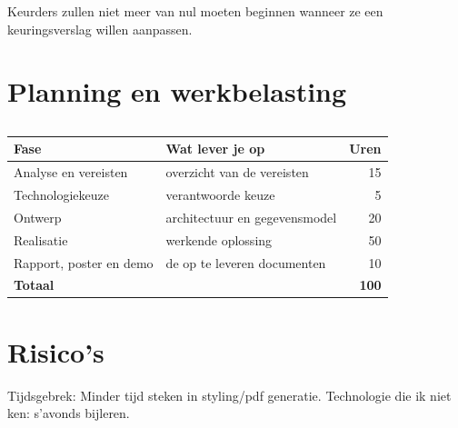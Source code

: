 Keurders zullen niet meer van nul moeten beginnen wanneer ze een keuringsverslag willen aanpassen.


\section{Planning en werkbelasting}%
\label{vst:planning}


\begin{table}[htbp]
  \centering
  \begin{tabular}{llr}
    \toprule
    \textbf{Fase} & \textbf{Wat lever je op} & \textbf{Uren} \\
    \midrule
    Analyse en vereisten      & overzicht van de vereisten   & 15  \\
    Technologiekeuze          & verantwoorde keuze           & 5  \\
    Ontwerp                   & architectuur en gegevensmodel& 20  \\
    Realisatie                & werkende oplossing           & 50  \\
    Rapport, poster en demo   & de op te leveren documenten  & 10  \\
    \midrule
    \textbf{Totaal}           &                              & \textbf{100} \\
    \bottomrule
  \end{tabular}
  \caption[Planning en werkbelasting]{\label{tab:vst-planning}%
    }
\end{table}


\section{Risico's}%
\label{vst:risicos}

%

Tijdsgebrek: Minder tijd steken in styling/pdf generatie.
Technologie die ik niet ken: s'avonds bijleren.
